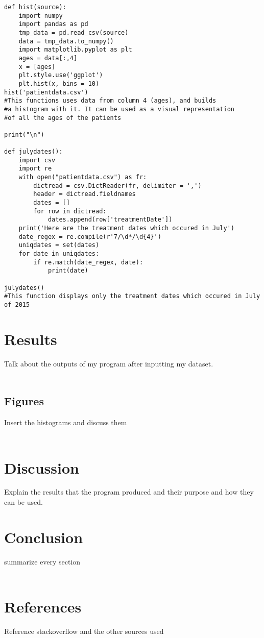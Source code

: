 \documentclass{article}
\begin{document}
\begin{verbatim}
def hist(source):
    import numpy
    import pandas as pd
    tmp_data = pd.read_csv(source)
    data = tmp_data.to_numpy()
    import matplotlib.pyplot as plt
    ages = data[:,4]
    x = [ages]
    plt.style.use('ggplot')
    plt.hist(x, bins = 10)
hist('patientdata.csv')
#This functions uses data from column 4 (ages), and builds
#a histogram with it. It can be used as a visual representation
#of all the ages of the patients

print("\n")

def julydates():
    import csv
    import re
    with open("patientdata.csv") as fr:
        dictread = csv.DictReader(fr, delimiter = ',')
        header = dictread.fieldnames
        dates = []
        for row in dictread:
            dates.append(row['treatmentDate'])
    print('Here are the treatment dates which occured in July')
    date_regex = re.compile(r'7/\d*/\d{4}')
    uniqdates = set(dates)
    for date in uniqdates:
        if re.match(date_regex, date):
            print(date)

julydates()
#This function displays only the treatment dates which occured in July of 2015

\end{verbatim}


\section{Results}
Talk about the outputs of my program after inputting my dataset. \\\\

\subsection{Figures}
Insert the histograms and discuss them\\\\

\section{Discussion}
Explain the results that the program produced and their purpose and how they can be used.

\section{Conclusion}
summarize every section\\\\

\section{References}
Reference stackoverflow and the other sources used\\\\
\end{document}
